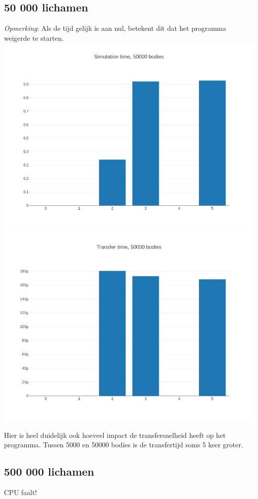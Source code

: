 \documentclass{article}
\begin{document}
\subsection{50 000 lichamen}
\textit{Opmerking}: Als de tijd gelijk is aan nul, betekent dit dat het programma weigerde te starten.
\includegraphics[width=\linewidth]{grafiekskes/hist_simulation50000.png}
\includegraphics[width=\linewidth]{grafiekskes/hist_transfer50000.png}

Hier is heel duidelijk ook hoeveel impact de transfersnelheid heeft op het programma.
Tussen 5000 en 50000 bodies is de transfertijd soms 5 keer groter.
\subsection{500 000 lichamen}
CPU faalt!
\end{document}
